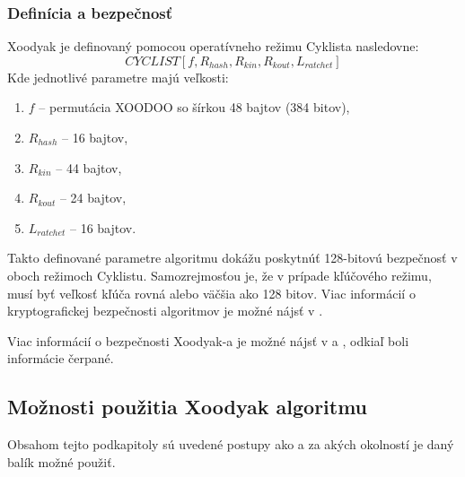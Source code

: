 \subsubsection{Definícia a bezpečnosť}
Xoodyak je definovaný pomocou operatívneho režimu Cyklista nasledovne:
\begin{equation}
	CYCLIST[f,R_{hash},R_{kin},R_{kout},L_{ratchet}]
\end{equation} 
Kde jednotlivé parametre majú veľkosti:
\begin{enumerate}
	\item $f$ -- permutácia XOODOO so šírkou 48 bajtov (384 bitov),
	\item $R_{hash}$ -- 16 bajtov,
	\item $R_{kin}$ -- 44 bajtov,
	\item $R_{kout}$ -- 24 bajtov,
	\item $L_{ratchet}$ -- 16 bajtov.  
\end{enumerate}
Takto definované parametre algoritmu dokážu poskytnúť 128-bitovú bezpečnosť v oboch režimoch Cyklistu. Samozrejmosťou je, že v prípade kľúčového režimu, musí byť veľkosť kľúča rovná alebo väčšia ako 128 bitov. Viac informácií o kryptografickej bezpečnosti algoritmov je možné nájsť v \cite{sec}.

Viac informácií o bezpečnosti Xoodyak-a je možné nájsť v \cite{xcb, 7.3} a \cite{xdr2}, odkiaľ boli informácie čerpané.

\subsection{Možnosti použitia Xoodyak algoritmu}
Obsahom tejto podkapitoly sú uvedené postupy ako a za akých okolností je daný balík možné použiť. 
